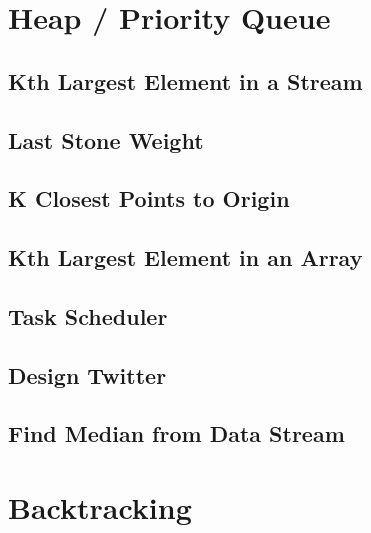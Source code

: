 \documentclass[12pt,letterpaper]{book}
\theoremstyle{definition}
\theoremstyle{remark}
\begin{document}
\chapter{Heap / Priority Queue}

\section{Kth Largest Element in a Stream}


\section{Last Stone Weight}


\section{K Closest Points to Origin}


\section{Kth Largest Element in an Array}


\section{Task Scheduler}


\section{Design Twitter}


\section{Find Median from Data Stream}


\chapter{Backtracking}
\end{document}

